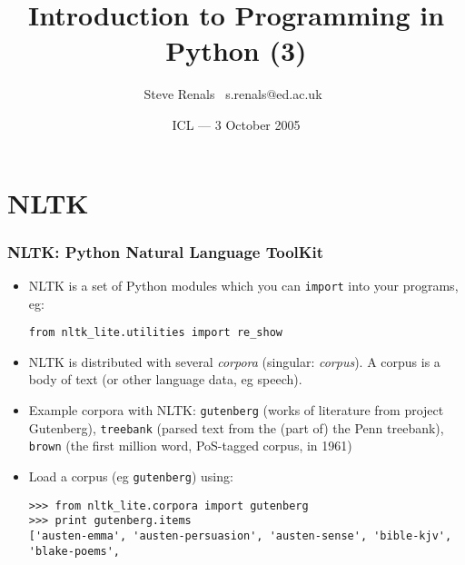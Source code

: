 \title{Introduction to Programming in Python (3)}
\author{Steve Renals \newline \mbox{ }s.renals@ed.ac.uk\mbox{ }}
\date{ICL --- 3 October 2005}



\frame{\titlepage}




\frame{\tableofcontents}

\section{NLTK}

\begin{frame}[fragile]
  \frametitle{NLTK: Python Natural Language ToolKit}

  \begin{itemize}
  \item<1-> NLTK is a set of Python modules which you can \texttt{import}
    into your programs, eg:
\begin{verbatim}
from nltk_lite.utilities import re_show
\end{verbatim}
  \item<2-> NLTK is distributed with several \emph{corpora} (singular:
    \emph{corpus}).  A corpus is  a body of text (or other language
    data, eg speech).
  \item<2-> Example corpora with NLTK:  \texttt{gutenberg}
    (works of literature from project Gutenberg), \texttt{treebank}
    (parsed text from the (part of) the Penn treebank), \texttt{brown}
    (the first  million word, PoS-tagged corpus, in 1961)
  \item<3-> Load a corpus (eg  \texttt{gutenberg}) using:
\begin{verbatim}
>>> from nltk_lite.corpora import gutenberg
>>> print gutenberg.items
['austen-emma', 'austen-persuasion', 'austen-sense', 'bible-kjv', 'blake-poems', 
\end{verbatim}
  \end{itemize}
\end{frame}

